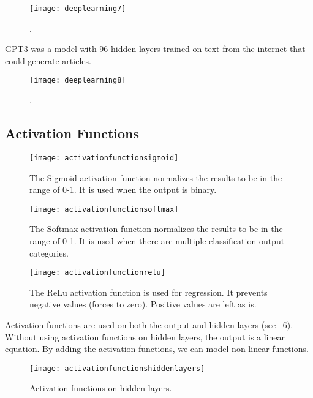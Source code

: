 	\begin{figure}[h]
		\centering
		\texttt{[image: deeplearning7]}
		\caption{.}
		\label{fig:deeplearning7}
	\end{figure}

GPT3 was a model with 96 hidden layers trained on text from the internet that could generate articles.

 	\begin{figure}[h]
		\centering
		\texttt{[image: deeplearning8]}
		\caption{.}
		\label{fig:deeplearning8}
	\end{figure}


	\subsection{Activation Functions}

 	\begin{figure}[h]
		\centering
		\texttt{[image: activationfunctionsigmoid]}
		\caption{The Sigmoid activation function normalizes the results to be in the range of 0-1.  It is used when the output is binary.}
		\label{fig:activationfunctionsigmoid}
	\end{figure}

 	\begin{figure}[h]
		\centering
		\texttt{[image: activationfunctionsoftmax]}
		\caption{The Softmax activation function normalizes the results to be in the range of 0-1.  It is used when there are multiple classification output categories.}
		\label{fig:activationfunctionsoftmax}
	\end{figure}

 	\begin{figure}[h]
		\centering
		\texttt{[image: activationfunctionrelu]}
		\caption{The ReLu activation function is used for regression.  It prevents negative values (forces to zero).  Positive values are left as is.}
		\label{fig:activationfunctionrelu}
	\end{figure}

Activation functions are used on both the output and hidden layers (see \figurename~\ref{fig:activationfunctionshiddenlayers}).  Without using activation functions on hidden layers, the output is a linear equation.  By adding the activation functions, we can model non-linear functions.

 	\begin{figure}[h]
		\centering
		\texttt{[image: activationfunctionshiddenlayers]}
		\caption{Activation functions on hidden layers.}
		\label{fig:activationfunctionshiddenlayers}
	\end{figure}

